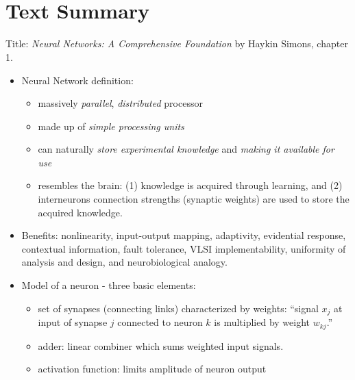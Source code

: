 \documentclass[paper=a4, fontsize=11pt]{scrartcl} %
\title{\hmwkClass \\
       \hmwkTitle}
\author{\hmwkAuthorFullName}
\date{\hmwkDueDate}
\begin{document}
    \maketitle
    \thispagestyle{fancy} %

    \section*{Text Summary}

    Title: \textit{Neural Networks: A Comprehensive Foundation} by Haykin Simons, chapter 1.

    \begin{itemize}
        \item Neural Network definition:
        \begin{itemize}
            \item massively \textit{parallel}, \textit{distributed} processor
            \item made up of \textit{simple processing units}
            \item can naturally \textit{store experimental knowledge} and \textit{making it available for use}
            \item resembles the brain: (1) knowledge is acquired through learning, and (2) interneurons connection strengths (synaptic weights) are used to store the acquired knowledge.
        \end{itemize}

        \item Benefits: nonlinearity, input-output mapping, adaptivity, evidential response, contextual information, fault tolerance, VLSI implementability, uniformity of analysis and design, and neurobiological analogy.
       
        \item Model of a neuron - three basic elements:
        \begin{itemize}
            \item set of synapses (connecting links) characterized by weights: ``signal $x_j$ at input of synapse $j$ connected to neuron $k$ is multiplied by weight $w_{kj}$.''
            \item adder: linear combiner which sums weighted input signals.
            \item activation function: limits amplitude of neuron output
        \end{itemize}


\end{itemize}
\end{document}
